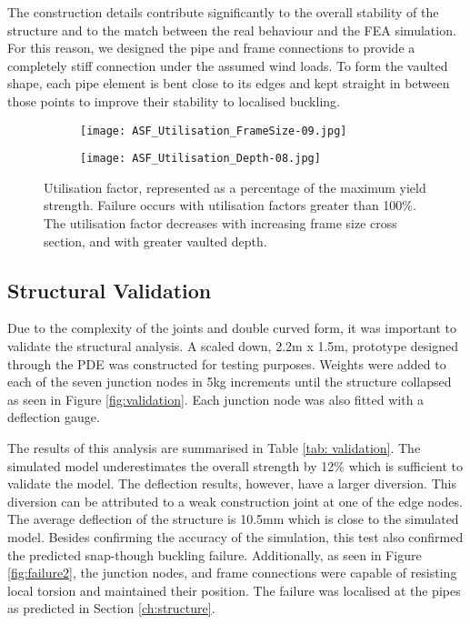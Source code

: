 The construction details contribute significantly to the overall stability of the structure and to the match between the real behaviour and the FEA simulation. For this reason, we designed the pipe and frame connections to provide a completely stiff connection under the assumed wind loads. To form the vaulted shape, each pipe element is bent close to its edges and kept straight in between those points to improve their stability to localised buckling.


\begin{figure}
    \centering
    \begin{subfigure}[b]{0.8\columnwidth}
        \texttt{[image: ASF\_Utilisation\_FrameSize-09.jpg]}
        \caption{} 
        \label{fig:frameSize}
    \end{subfigure} 
    \vspace{10mm}

    \begin{subfigure}[b]{0.8\columnwidth}
        \texttt{[image: ASF\_Utilisation\_Depth-08.jpg]}
        \caption{}
        \label{fig:StructuralDepth}
    \end{subfigure}
    \hfill

    \caption{Utilisation factor, represented as a percentage of the maximum yield strength. Failure occurs with utilisation factors greater than 100\%. The utilisation factor decreases with increasing frame size cross section, and with greater vaulted depth.}
    \label{fig:utilisation}
\end{figure}

\subsection{Structural Validation}

Due to the complexity of the joints and double curved form, it was important to validate the structural analysis. A scaled down, 2.2m x 1.5m, prototype designed through the PDE was constructed for testing purposes. Weights were added to each of the seven junction nodes in 5kg increments until the structure collapsed as seen in Figure \ref{fig:validation}. Each junction node was also fitted with a deflection gauge.

The results of this analysis are summarised in Table \ref{tab: validation}. The simulated model underestimates the overall strength by 12\% which is sufficient to validate the model. The deflection results, however, have a larger diversion. This diversion can be attributed to a weak construction joint at one of the edge nodes. The average deflection of the structure is 10.5mm which is close to the simulated model. Besides confirming the accuracy of the simulation, this test also confirmed the predicted snap-though buckling failure. Additionally, as seen in Figure \ref{fig:failure2}, the junction nodes, and frame connections were capable of resisting local torsion and maintained their position. The failure was localised at the pipes as predicted in Section \ref{ch:structure}. 

